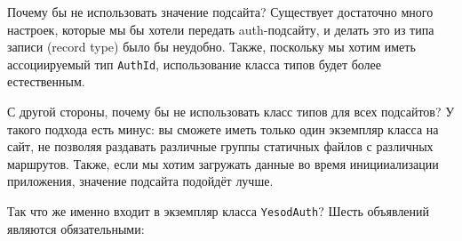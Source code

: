 \begin{remark}
Почему бы не использовать значение подсайта? Существует достаточно много настроек, которые мы бы хотели передать auth-подсайту, и делать это из типа записи (record type) было бы неудобно. Также, поскольку мы хотим иметь ассоциируемый тип \lstinline'AuthId', использование класса типов будет более естественным.

С другой стороны, почему бы не использовать класс типов для всех подсайтов? У такого подхода есть минус: вы сможете иметь только один экземпляр класса на сайт, не позволяя раздавать различные группы статичных файлов с различных маршрутов. Также, если мы хотим загружать данные во время иницииализации приложения, значение подсайта подойдёт лучше.
\end{remark}

Так что же именно входит в экземпляр класса \lstinline'YesodAuth'? Шесть объявлений являются обязательными:

